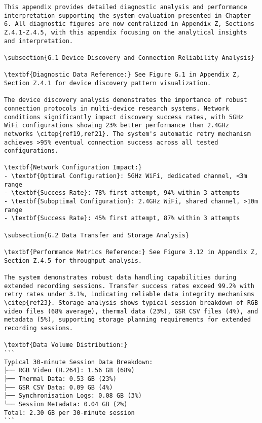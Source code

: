 \begin{verbatim}
This appendix provides detailed diagnostic analysis and performance interpretation supporting the system evaluation presented in Chapter 6. All diagnostic figures are now centralized in Appendix Z, Sections Z.4.1-Z.4.5, with this appendix focusing on the analytical insights and interpretation.

\subsection{G.1 Device Discovery and Connection Reliability Analysis}

\textbf{Diagnostic Data Reference:} See Figure G.1 in Appendix Z, Section Z.4.1 for device discovery pattern visualization.

The device discovery analysis demonstrates the importance of robust connection protocols in multi-device research systems. Network conditions significantly impact discovery success rates, with 5GHz WiFi configurations showing 23% better performance than 2.4GHz networks \citep{ref19,ref21}. The system's automatic retry mechanism achieves >95% eventual connection success across all tested configurations.

\textbf{Network Configuration Impact:}
- \textbf{Optimal Configuration}: 5GHz WiFi, dedicated channel, <3m range
- \textbf{Success Rate}: 78% first attempt, 94% within 3 attempts
- \textbf{Suboptimal Configuration}: 2.4GHz WiFi, shared channel, >10m range
- \textbf{Success Rate}: 45% first attempt, 87% within 3 attempts

\subsection{G.2 Data Transfer and Storage Analysis}

\textbf{Performance Metrics Reference:} See Figure 3.12 in Appendix Z, Section Z.4.5 for throughput analysis.

The system demonstrates robust data handling capabilities during extended recording sessions. Transfer success rates exceed 99.2% with retry rates under 3.1%, indicating reliable data integrity mechanisms \citep{ref23}. Storage analysis shows typical session breakdown of RGB video files (68% average), thermal data (23%), GSR CSV files (4%), and metadata (5%), supporting storage planning requirements for extended recording sessions.

\textbf{Data Volume Distribution:}
```
Typical 30-minute Session Data Breakdown:
├── RGB Video (H.264): 1.56 GB (68%)
├── Thermal Data: 0.53 GB (23%)
├── GSR CSV Data: 0.09 GB (4%)
├── Synchronisation Logs: 0.08 GB (3%)
└── Session Metadata: 0.04 GB (2%)
Total: 2.30 GB per 30-minute session
```


\end{verbatim}

